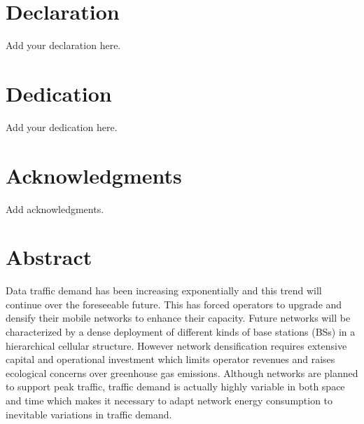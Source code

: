 \documentclass[12pt]{report}
\begin{document}
				



\section*{Declaration}

Add your declaration here.



\newpage


\section*{Dedication}

\vspace{2cm}
\begin{center}
Add your dedication here.
\end{center}



\newpage

\section*{Acknowledgments}

Add acknowledgments. 


\lipsum[2-4]



\newpage



\section*{Abstract}


Data traffic demand has been increasing exponentially and this trend will continue over the foreseeable future. This has forced operators to upgrade and densify their mobile networks to enhance their capacity. Future networks will be characterized by a dense deployment of different kinds of base stations (BSs) in a hierarchical cellular structure. However network densification requires extensive capital and operational investment which limits operator revenues and raises ecological concerns over greenhouse gas emissions. Although networks are planned to support peak traffic, traffic demand is actually highly variable in both space and time which makes it necessary to adapt network energy consumption to inevitable variations in traffic demand. 
\end{document}
